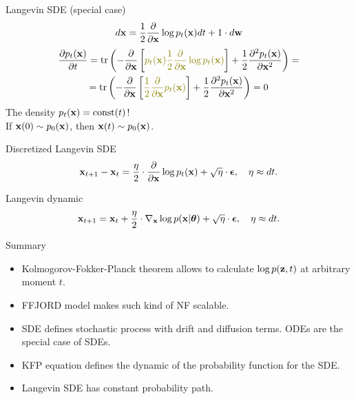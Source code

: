 \begin{frame}{Langevin SDE (special case)}
	\[
		d \mathbf{x} = \frac{1}{2} \frac{\partial}{\partial \mathbf{x}} \log p_t(\mathbf{x}) d t + 1 \cdot d \mathbf{w}
	\]
	\begin{multline*}
		\frac{\partial p_t(\bx)}{\partial t} =  \text{tr} \left(- \frac{\partial}{\partial \bx}\left[ {\color{olive}p_t(\bx) \frac{1}{2} \frac{\partial}{\partial \bx} \log p_t(\bx)} \right]  + \frac{1}{2} \frac{\partial^2 p_t(\bx)}{\partial \bx^2} \right) = \\
		= \text{tr} \left(- \frac{\partial}{\partial \bx}\left[ {\color{olive}\frac{1}{2} \frac{\partial}{\partial \bx} p_t(\bx) } \right]  + \frac{1}{2} \frac{\partial^2 p_t(\bx)}{\partial \bx^2} \right) = 0
	\end{multline*}
	The density $p_t(\mathbf{x}) = \text{const}(t)$! \\ If $\mathbf{x}(0) \sim p_0(\mathbf{x})$, then $\mathbf{x}(t) \sim p_0(\mathbf{x})$.
	\begin{block}{Discretized Langevin SDE}
		\vspace{-0.3cm}
		\[
			\mathbf{x}_{t + 1} - \mathbf{x}_t = \frac{\eta}{2} \cdot \frac{\partial}{\partial \mathbf{x}} \log p_t(\mathbf{x}) + \sqrt{\eta} \cdot \boldsymbol{\epsilon}, \quad \eta \approx dt.
		\]
		\vspace{-0.4cm}
	\end{block}
	\begin{block}{Langevin dynamic}
		\vspace{-0.3cm}
		\[
			\mathbf{x}_{t + 1} = \mathbf{x}_t + \frac{\eta}{2} \cdot \nabla_{\mathbf{x}} \log p(\mathbf{x} | \boldsymbol{\theta}) + \sqrt{\eta} \cdot \boldsymbol{\epsilon}, \quad \eta \approx dt.
		\]
		\vspace{-0.3cm}
	\end{block}
\end{frame}
\begin{frame}{Summary}
	\begin{itemize}
		\item Kolmogorov-Fokker-Planck theorem allows to calculate $\log p(\mathbf{z}, t)$ at arbitrary moment $t$.
		\vfill
		\item FFJORD model makes such kind of NF scalable.
		\vfill
		\item SDE defines stochastic process with drift and diffusion terms. ODEs are the special case of SDEs.
		\vfill
		\item KFP equation defines the dynamic of the probability function for the SDE. 
		\vfill
		\item Langevin SDE has constant probability path.
	\end{itemize}
\end{frame}
 